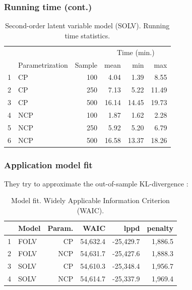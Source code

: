 \documentclass[arial,12pt,xcolor=dvipsnames]{beamer}
\begin{document}
\begin{frame}
	\frametitle{Running time (cont.)}
	\begin{table}[h]
		\centering
		\begin{tabular}{rlrrrr}
			\hline
			\multicolumn{3}{c}{ }& \multicolumn{3}{c}{ Time (min.) } \\ 
			\cmidrule(rl){4-6} 
			& Parametrization & Sample & mean & min & max \\ 
			\hline\hline
			1 & CP & 100 & 4.04 & 1.39 & 8.55 \\ 
			2 & CP & 250 & 7.13 & 5.22 & 11.49 \\ 
			3 & CP & 500 & 16.14 & 14.45 & 19.73 \\ 
			\hline
			4 & NCP & 100 & 1.87 & 1.62 & 2.28 \\ 
			5 & NCP & 250 & 5.92 & 5.20 & 6.79 \\ 
			6 & NCP & 500 & 16.58 & 13.37 & 18.26 \\
			\hline
		\end{tabular}
		\caption{Second-order latent variable model (SOLV). Running time statistics.} 
		\label{tab:SOLV_time}
	\end{table}
\end{frame}
%
\begin{frame}
	\frametitle{Application model fit}
	They try to approximate the out-of-sample KL-divergence \cite{Kullback_et_al_1951}:
	\begin{table}[H]
		\centering
		\begin{tabular}{rlrrrr}
			\hline
			& Model & Param. & WAIC & lppd & penalty \\  
			\hline\hline
			1 & FOLV & CP &  54,632.4 & -25,429.7 & 1,886.5 \\ 
			2 & FOLV & NCP & 54,631.7 & -25,427.6 & 1,888.3 \\
			\hline
			3 & SOLV & CP &  54,610.3 & -25,348.4 & 1,956.7 \\  
			4 & SOLV & NCP & 54,614.7 & -25,337.9 & 1,969.4 \\ 
			\hline
		\end{tabular}
		\caption[Model fit. Widely Applicable Information Criterion (WAIC).]%
		{Model fit. Widely Applicable Information Criterion (WAIC).}
		\label{tab:model_fit1}
	\end{table}
\end{frame}
%
\end{document}
